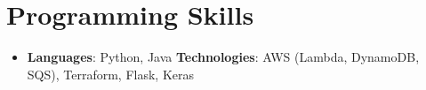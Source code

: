 \documentclass[letterpaper,11pt]{article}
\newcommand{\resumeItem}[2]{
  \item\small{
    \textbf{#1}{: #2 \vspace{-2pt}}
  }
}
\newcommand{\resumeSubItem}[2]{\resumeItem{#1}{#2}\vspace{-4pt}}
\newcommand{\resumeSubHeadingListStart}{\begin{itemize}[leftmargin=*]}
\newcommand{\resumeSubHeadingListEnd}{\end{itemize}}
\begin{document}


\section{Programming Skills}
  \resumeSubHeadingListStart
    \item{
      \textbf{Languages}{: Python, Java}
      \hfill
      \textbf{Technologies}{: AWS (Lambda, DynamoDB, SQS), Terraform, Flask, Keras}
    }
  \resumeSubHeadingListEnd


\end{document}
